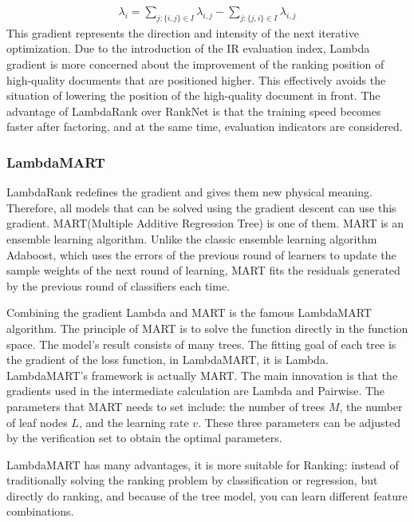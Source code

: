 \begin{equation}
\begin{aligned}
\lambda_i = \sum_{j:\{i,j\} \in I} \lambda_{i,j} - \sum_{j:\{j,i\} \in I} \lambda_{i,j}
\end{aligned}
\label{eqn:eq14}
\end{equation}
This gradient represents the direction and intensity of the next iterative optimization. Due to the introduction of the IR evaluation index, Lambda gradient is more concerned about the improvement of the ranking position of high-quality documents that are positioned higher. This effectively avoids the situation of lowering the position of the high-quality document in front. The advantage of LambdaRank over RankNet is that the training speed becomes faster after factoring, and at the same time, evaluation indicators are considered.

\subsubsection{LambdaMART}
LambdaRank redefines the gradient and gives them new physical meaning. Therefore, all models that can be solved using the gradient descent can use this gradient. MART(Multiple Additive Regression Tree) is one of them. MART is an ensemble learning algorithm. Unlike the classic ensemble learning algorithm Adaboost, which uses the errors of the previous round of learners to update the sample weights of the next round of learning, MART fits the residuals generated by the previous round of classifiers each time.

Combining the gradient Lambda and MART is the famous LambdaMART algorithm. The principle of MART is to solve the function directly in the function space. The model's result consists of many trees. The fitting goal of each tree is the gradient of the loss function, in LambdaMART, it is Lambda. LambdaMART's framework is actually MART. The main innovation is that the gradients used in the intermediate calculation are Lambda and Pairwise. The parameters that MART needs to set include: the number of trees $M$, the number of leaf nodes $L$, and the learning rate $v$. These three parameters can be adjusted by the verification set to obtain the optimal parameters. 

LambdaMART has many advantages, it is more suitable for Ranking: instead of traditionally solving the ranking problem by classification or regression, but directly do ranking, and because of the tree model, you can learn different feature combinations.

